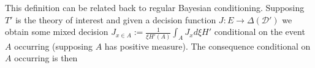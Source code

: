 This definition can be related back to regular Bayesian conditioning. Supposing $T'$ is the theory of interest and given a decision function $J:E\to \Delta(\mathcal{D}')$ we obtain some mixed decision $J_{x\in A}:= \frac{1}{\xi H' (A)} \int_A J_x d\xi H' $ conditional on the event $A$ occurring (supposing $A$ has positive measure). The consequence conditional on $A$ occurring is then 



